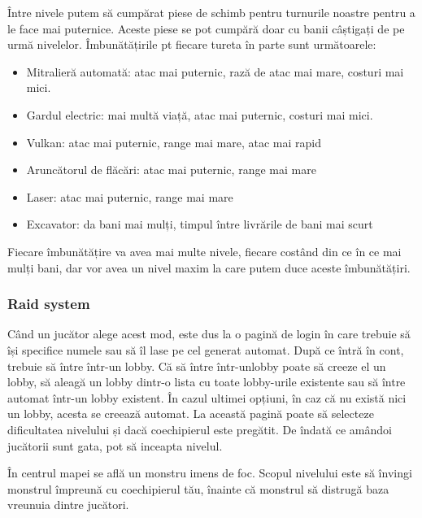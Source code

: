 \documentclass[12pt, a4paper]{article}
\begin{document}
	Între nivele putem să cumpărat piese de schimb pentru turnurile noastre pentru a le face mai puternice. Aceste piese se pot cumpără doar cu banii câștigați de pe urmă nivelelor. Îmbunătățirile pt fiecare tureta în parte sunt următoarele:
	
	\begin{itemize}
		\item Mitralieră automată: atac mai puternic, rază de atac mai mare, costuri mai mici.
		\item Gardul electric: mai multă viață, atac mai puternic, costuri mai mici.
		\item Vulkan: atac mai puternic, range mai mare, atac mai rapid
		\item Aruncătorul de flăcări: atac mai puternic, range mai mare
		\item Laser: atac mai puternic, range mai mare
		\item Excavator: da bani mai mulți, timpul între livrările de bani mai scurt
	\end{itemize}
	
	Fiecare îmbunătățire va avea mai multe nivele, fiecare costând din ce în ce mai mulți bani, dar vor avea un nivel maxim la care putem duce aceste îmbunătățiri.
	
	
	
	
	
	\subsubsection{Raid system}
	
	Când un jucător alege acest mod, este dus la o pagină de login în care trebuie să își specifice numele sau să îl lase pe cel generat automat. După ce întră în cont, trebuie să între într-un lobby. Că să între într-unlobby poate să creeze el un lobby, să aleagă un lobby dintr-o lista cu toate lobby-urile existente sau să între automat într-un lobby existent. În cazul ultimei opțiuni, în caz că nu există nici un lobby, acesta se creează automat. La această pagină poate să selecteze dificultatea nivelului și dacă coechipierul este pregătit. De îndată ce amândoi jucătorii sunt gata, pot să inceapta nivelul.
	\newline
	
	În centrul mapei se află un monstru imens de foc. Scopul nivelului este să învingi monstrul împreună cu coechipierul tău, înainte că monstrul să distrugă baza vreunuia dintre jucători.
	\newline
	
\end{document}
